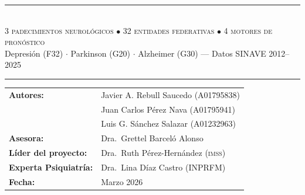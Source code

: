 \documentclass[12pt, letterpaper]{article}
\newcommand{\imss}{\textnormal{\textsc{imss}}}
\begin{document}
\vspace{5.8cm}

\vfill

\begin{center}
\textcolor{coolgray}{\rule{0.85\textwidth}{0.4pt}}\\[0.3cm]
{\color{teal}\small\textsc{3 padecimientos neurológicos}} \quad
{\color{coolgray}$\bullet$} \quad
{\color{teal}\small\textsc{32 entidades federativas}} \quad
{\color{coolgray}$\bullet$} \quad
{\color{teal}\small\textsc{4 motores de pronóstico}}\\[0.15cm]
{\color{coolgray}\scriptsize Depresión (F32) $\cdot$ Parkinson (G20) $\cdot$ Alzheimer (G30) — Datos SINAVE 2012--2025}\\[0.3cm]
\textcolor{coolgray}{\rule{0.85\textwidth}{0.4pt}}
\end{center}

\vspace{0.5cm}

\begin{center}
\small
\begin{tabular}{ll}
\textcolor{burgundy}{\bfseries Autores:} & Javier A. Rebull Saucedo \textcolor{coolgray}{(A01795838)} \\
 & Juan Carlos Pérez Nava \textcolor{coolgray}{(A01795941)} \\
 & Luis G. Sánchez Salazar \textcolor{coolgray}{(A01232963)} \\[0.3cm]
\textcolor{burgundy}{\bfseries Asesora:} & Dra.~Grettel Barceló Alonso \\[0.15cm]
\textcolor{burgundy}{\bfseries Líder del proyecto:} & Dra.~Ruth Pérez-Hernández (\imss{}) \\[0.1cm]
\textcolor{burgundy}{\bfseries Experta Psiquiatría:} & Dra.~Lina Díaz Castro (INPRFM) \\[0.3cm]
\textcolor{burgundy}{\bfseries Fecha:} & Marzo 2026 \\
\end{tabular}
\end{center}

\vfill

\vspace{0.3cm}

\end{document}
